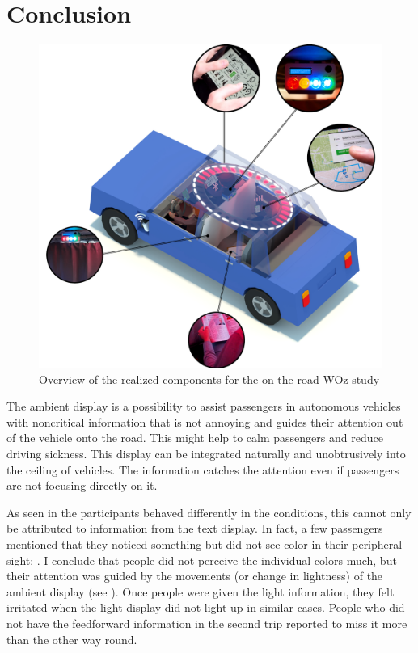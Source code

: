 \chapter{Conclusion}
\label{ch:conclusion}

\begin{figure}
    \includegraphics[width=\textwidth]{fig/PosterFigure_1920.png}
    \caption[Overview]{Overview of the realized components for the on-the-road WOz study}
    \label{fig:overview}
\end{figure}

The ambient display is a possibility to assist passengers in autonomous vehicles with noncritical information that is not annoying and guides their attention out of the vehicle onto the road. 
This might help to calm passengers and reduce driving sickness. This display can be integrated naturally and unobtrusively into the ceiling of vehicles. The information catches the attention even if passengers are not focusing directly on it. 

As seen in the \emph{} participants behaved differently in the conditions, this cannot only be attributed to information from the text display. In fact, a few passengers mentioned that they noticed something but did not see color in their peripheral sight: . I conclude that people did not perceive the individual colors much, but their attention was guided by the movements (or change in lightness) of the ambient display (see \emph{}). 
Once people were given the light information, they felt irritated when the light display did not light up in similar cases. People who did not have the feedforward information in the second trip reported to miss it more than the other way round. 

